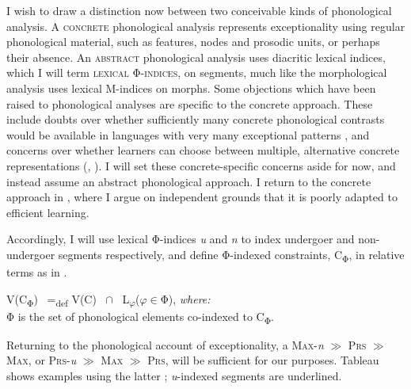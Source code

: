 \documentclass[output=paper,
modfonts
]{LSP/langsci}
\begin{document}
I wish to draw a distinction now between two conceivable kinds of phonological analysis. A \textsc{concrete} phonological analysis represents exceptionality using regular phonological material, such as features,  nodes and prosodic units, or perhaps their absence. An \textsc{abstract} phonological analysis uses diacritic lexical indices, which I will term \textsc{lexical} Φ\textsc{{}-indices}, on segments, much like the morphological analysis uses lexical M-indices on morphs. Some objections which have been raised to phonological analyses are specific to the concrete approach. These include doubts over whether sufficiently many concrete phonological contrasts would be available in languages with very many exceptional patterns \citep{gouskova2012}, and concerns over whether learners can choose between multiple, alternative concrete representations (\citealt{kiparsky1973r}, \citealt{pater2009r}). I will set these concrete-specific concerns aside for now, and instead assume an abstract phonological approach. I return to the concrete approach in , where I argue on independent grounds that it is poorly adapted to efficient learning.

Accordingly, I will use lexical Φ-indices\textit{ u} and\textit{ n} to index undergoer and non-undergoer segments respectively, and define Φ-indexed constraints\textsc{,} C\textsubscript{Φ}, in relative terms as in .

\ea \label{ex:round:21}
V(\textsc{C}\textsubscript{Φ}) \ =\textsubscript{def} V(\textsc{C}) \ ${\cap}$ \ L\textsubscript{$\varphi $}($\varphi $${\in}$Φ), \textit{where:} \\
Φ\textsc{} is the set of phonological elements co-indexed to C\textsubscript{Φ}.
\z

Returning to the phonological account of  exceptionality, a   \textsc{Max-}\textit{n}\textsc{} \textsc{${\gg}$} \textsc{Prs} \textsc{${\gg}$} \textsc{Max}, or \textsc{Prs}\textsc{{}-}\textit{u}\textsc{} \textsc{${\gg}$} \textsc{Max} \textsc{${\gg}$} \textsc{Prs}, will be sufficient for our purposes. Tableau  shows examples using the latter ; \textit{u}{}-indexed segments are underlined.
\end{document}
